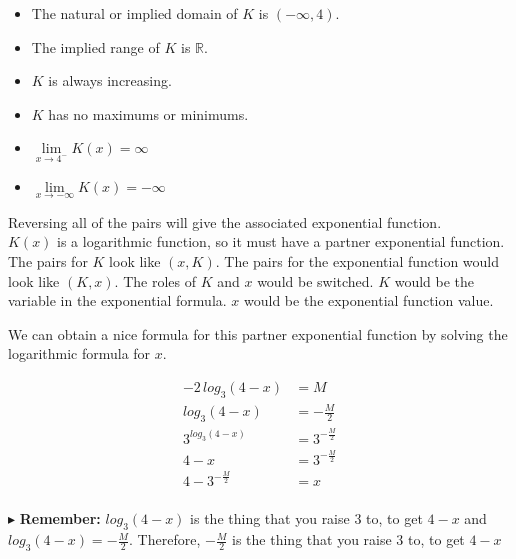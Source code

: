 \documentclass{ximera}
\begin{document}
\begin{example}
\begin{explanation}
\begin{itemize}
\item The natural or implied domain of $K$ is $(-\infty, 4)$.
\item The implied range of $K$ is $\mathbb{R}$.
\item $K$ is always increasing.
\item $K$ has no maximums or minimums.
\item $\lim\limits_{x \to 4^-} K(x) = \infty$
\item $\lim\limits_{x \to -\infty} K(x) = -\infty$
\end{itemize}




\end{explanation}
\end{example}









Reversing all of the pairs will give the associated exponential function.  \\



$K(x)$ is a logarithmic function, so it must have a partner exponential function.  The pairs for $K$ look like $(x, K)$. The pairs for the exponential function would look like $(K, x)$.  The roles of $K$ and $x$ would be switched. $K$ would be the variable in the exponential formula. $x$ would be the exponential function value.


We can obtain a nice formula for this partner exponential function by solving the logarithmic formula for $x$.





\begin{align*}
-2 \,log_3(4-x) & = M \\
log_3(4-x) & = -\frac{M}{2} \\
3^{log_3(4-x)} & = 3^{-\frac{M}{2}} \\
4 - x & = 3^{-\frac{M}{2}} \\
4 - 3^{-\frac{M}{2}} & = x \\
\end{align*}




$\blacktriangleright$ \textbf{Remember:} $log_3(4-x)$ is the thing that you raise $3$ to, to get $4-x$ and $log_3(4-x) = - \frac{M}{2}$.  Therefore, $- \frac{M}{2}$ is the thing that you raise $3$ to, to get $4-x$
\end{document}
